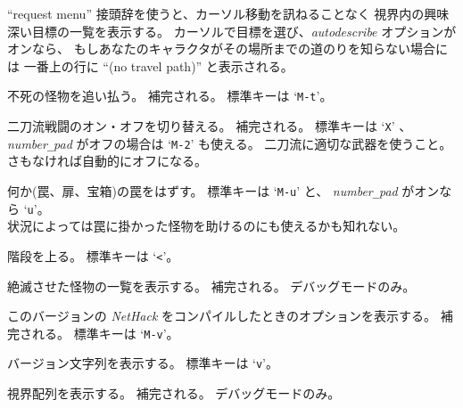 ``request menu'' 接頭辞を使うと、カーソル移動を訊ねることなく
視界内の興味深い目標の一覧を表示する。
カーソルで目標を選び、{\it autodescribe\/} オプションがオンなら、
もしあなたのキャラクタがその場所までの道のりを知らない場合には
一番上の行に ``(no travel path)'' と表示される。
\item[\tb{\#turn}]
不死の怪物を追い払う。
補完される。
標準キーは `{\tt M-t}'。
\item[\tb{\#twoweapon}]
二刀流戦闘のオン・オフを切り替える。
補完される。
標準キーは `{\tt X}' 、{\it number\verb+_+pad\/} がオフの場合は
`{\tt M-2}' も使える。
二刀流に適切な武器を使うこと。
さもなければ自動的にオフになる。
\item[\tb{\#untrap}]
何か(罠、扉、宝箱)の罠をはずす。
標準キーは `{\tt M-u}' と、
{\it number\verb+_+pad\/} がオンなら `{\tt u}'。\\
状況によっては罠に掛かった怪物を助けるのにも使えるかも知れない。
\item[\tb{\#up}]
階段を上る。
標準キーは `{\tt <}'。
\item[\tb{\#vanquished}]
絶滅させた怪物の一覧を表示する。
補完される。
デバッグモードのみ。
\item[\tb{\#version}]
このバージョンの {\it NetHack\/} をコンパイルしたときのオプションを表示する。
補完される。
標準キーは `{\tt M-v}'。
\item[\tb{\#versionshort}]
バージョン文字列を表示する。
標準キーは `{\tt v}'。
\item[\tb{\#vision}]
視界配列を表示する。
補完される。
デバッグモードのみ。
\item[\tb{\#wait}]
